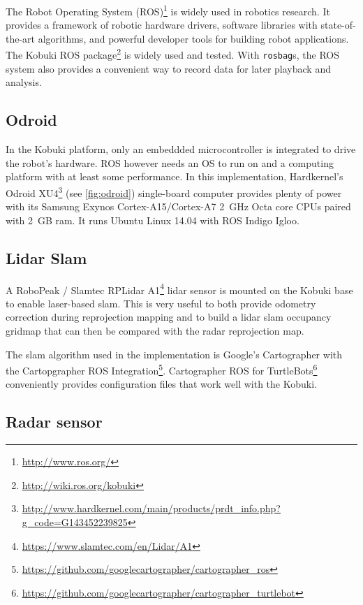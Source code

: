 The Robot Operating System (ROS)\footnote{\url{http://www.ros.org/}} is widely used in robotics research. It provides a framework of robotic hardware drivers, software libraries with state-of-the-art algorithms, and powerful developer tools for building robot applications. The Kobuki ROS package\footnote{\url{http://wiki.ros.org/kobuki}} is widely used and tested. With \texttt{rosbag}s, the ROS system also provides a convenient way to record data for later playback and analysis.

\subsection{Odroid}\label{odroid}

In the Kobuki platform, only an embeddded microcontroller is integrated to drive the robot's hardware. ROS however needs an OS to run on and a computing platform with at least some performance. In this implementation, Hardkernel's Odroid XU4\footnote{\url{http://www.hardkernel.com/main/products/prdt_info.php?g_code=G143452239825}} (see \cref{fig:odroid}) single-board computer provides plenty of power with its Samsung Exynos Cortex-A15/Cortex-A7 \SI{2}{GHz} Octa core CPUs paired with \SI{2}{GB} ram. It runs Ubuntu Linux 14.04 with ROS Indigo Igloo.

\subsection{Lidar Slam}\label{lidar}
A RoboPeak / Slamtec RPLidar A1\footnote{\url{https://www.slamtec.com/en/Lidar/A1}} lidar sensor is mounted on the Kobuki base to enable laser-based slam. This is very useful to both provide odometry correction during reprojection mapping and to build a lidar slam occupancy gridmap that can then be compared with the radar reprojection map.

The slam algorithm used in the implementation is Google's Cartographer \cite{Hess2016} with the Cartopgrapher ROS Integration\footnote{\url{https://github.com/googlecartographer/cartographer_ros}}. Cartographer ROS for TurtleBots\footnote{\url{https://github.com/googlecartographer/cartographer_turtlebot}} conveniently provides configuration files that work well with the Kobuki.

\subsection{Radar sensor}\label{radar-sensor}

